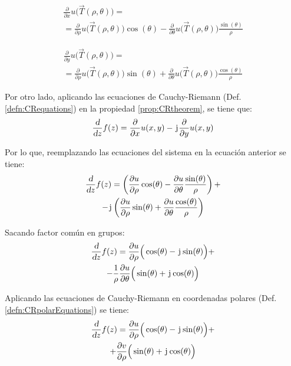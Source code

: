 \begin{multline*}
    \frac{\partial}{\partial x} u \Big( \Vec{T}(\rho,\theta) \Big) =
    \\
    = \frac{\partial}{\partial \rho} u \Big( \Vec{T}(\rho,\theta) \Big) \cos(\theta) - \frac{\partial}{\partial \theta} u \Big( \Vec{T}(\rho,\theta) \Big) \frac{\sin(\theta)}{\rho}
\end{multline*}

\begin{multline*}
    \frac{\partial}{\partial y} u \Big( \Vec{T}(\rho,\theta) \Big) =
    \\
    = \frac{\partial}{\partial \rho} u \Big( \Vec{T}(\rho,\theta) \Big) \sin(\theta) + \frac{\partial}{\partial \theta} u \Big( \Vec{T}(\rho,\theta) \Big) \frac{\cos(\theta)}{\rho}
\end{multline*}

Por otro lado, aplicando las ecuaciones de Cauchy-Riemann (Def. \ref{defn:CRequations}) en la propiedad \ref{prop:CRtheorem}, se tiene que:
\begin{equation*}
    \frac{\textsl{d}}{\textsl{d} z} f(z) = \frac{\partial}{\partial x} u(x,y) - \mkern2mu\mathrm{j}\mkern1mu \frac{\partial}{\partial y} u(x,y)
\end{equation*}

Por lo que, reemplazando las ecuaciones del sistema en la ecuación anterior se tiene:
\begin{multline*}
    \frac{\textsl{d}}{\textsl{d} z} f(z) = \left( \frac{\partial u}{\partial \rho} \cos(\theta) - \frac{\partial u}{\partial \theta} \frac{\sin(\theta)}{\rho} \right) +
    \\
    - \mkern2mu\mathrm{j}\mkern1mu \left( \frac{\partial u}{\partial \rho} \sin(\theta) + \frac{\partial u}{\partial \theta} \frac{\cos(\theta)}{\rho} \right)
\end{multline*}

Sacando factor común en grupos:
\begin{multline*}
    \frac{\textsl{d}}{\textsl{d} z} f(z) = \frac{\partial u}{\partial \rho} \Big( \cos(\theta) - \mkern2mu\mathrm{j}\mkern1mu \sin(\theta) \Big) +
    \\
    - \frac{1}{\rho} \frac{\partial u}{\partial \theta} \Big( \sin(\theta) + \mkern2mu\mathrm{j}\mkern1mu \cos(\theta) \Big)
\end{multline*}

Aplicando las ecuaciones de Cauchy-Riemann en coordenadas polares (Def. \ref{defn:CRpolarEquations}) se tiene:
\begin{multline*}
    \frac{\textsl{d}}{\textsl{d} z} f(z) = \frac{\partial u}{\partial \rho} \Big( \cos(\theta) - \mkern2mu\mathrm{j}\mkern1mu \sin(\theta) \Big) +
    \\
    + \frac{\partial v}{\partial \rho} \Big( \sin(\theta) + \mkern2mu\mathrm{j}\mkern1mu \cos(\theta) \Big)
\end{multline*}

